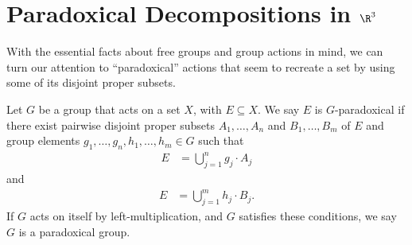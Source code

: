 \section{Paradoxical Decompositions in $\R^3$}%
With the essential facts about free groups and group actions in mind, we can turn our attention to ``paradoxical'' actions that seem to recreate a set by using some of its disjoint proper subsets.
\begin{definition}
  Let $G$ be a group that acts on a set $X$, with $E\subseteq X$. We say $E$ is $G${-paradoxical} if there exist pairwise disjoint proper subsets $A_1,\dots,A_n$ and $B_1,\dots,B_m$ of $E$ and group elements $g_1,\dots,g_n,h_1,\dots,h_m\in G$ such that
  \begin{align*}
    E &= \bigcup_{j=1}^{n}g_j\cdot A_j
  \end{align*}
  and
  \begin{align*}
    E &= \bigcup_{j=1}^{m}h_j\cdot B_j.
  \end{align*}
  If $G$ acts on itself by left-multiplication, and $G$ satisfies these conditions, we say $G$ is a {paradoxical group}.
\end{definition}
